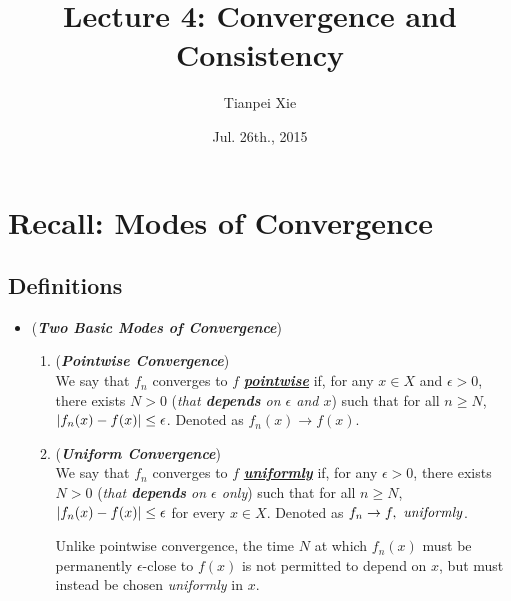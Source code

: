 \documentclass[11pt]{article}
\begin{document}
\title{Lecture 4: Convergence and Consistency}
\author{ Tianpei Xie}
\date{ Jul. 26th., 2015 }
\maketitle
\tableofcontents
\newpage
\section{Recall: Modes of Convergence}
\subsection{Definitions}
\begin{itemize}
\item \begin{remark} (\emph{\textbf{Two Basic Modes of Convergence}}) \citep{royden1988real, tao2011introduction}
\begin{enumerate}
\item \begin{definition}  (\emph{\textbf{Pointwise Convergence}})\\
We say that $f_n$ converges to $f$ \underline{\emph{\textbf{pointwise}}} if, for any $x\in X$ and $\epsilon > 0$, there exists $N > 0$ (\emph{that \textbf{depends} on $\epsilon$ and $x$}) such that for all $n \ge N$, $\left\lvert f_n(x) - f(x) \right\rvert \le  \epsilon$. Denoted as $f_{n}(x)\rightarrow f(x)$.
\end{definition}

\item\begin{definition} (\emph{\textbf{Uniform Convergence}})\\
We say that $f_n$ converges to $f$ \underline{\emph{\textbf{uniformly}}} if,  for any $\epsilon > 0$, there exists $N > 0$ (\emph{that \textbf{depends} on $\epsilon$ only})  such that for all $n \ge N$, $\left\lvert f_n(x) - f(x) \right\rvert \le  \epsilon$  for every $x \in X$. Denoted as $f_{n} \rightarrow f, \text{ \emph{uniformly}}$.
\end{definition}
Unlike pointwise convergence, the time $N$ at which $f_n(x)$ must be permanently $\epsilon$-close to $f(x)$ is not permitted to depend on $x$, but must instead be
chosen \emph{uniformly} in $x$.
\end{enumerate}
\end{remark}


\end{itemize}
\end{document}

